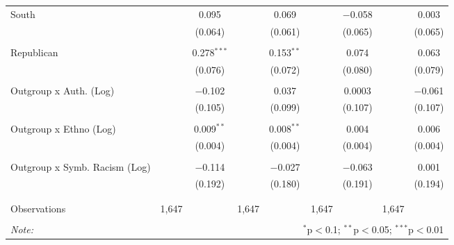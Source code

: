 \begin{table}[H]
{\begin{tabular}{@{\extracolsep{5pt}}lcccccccc}
 South &  & 0.095 &  & 0.069 &  & $-$0.058 &  & 0.003 \\ 
  &  & (0.064) &  & (0.061) &  & (0.065) &  & (0.065) \\ 
  & & & & & & & & \\ 
 Republican &  & 0.278$^{***}$ &  & 0.153$^{**}$ &  & 0.074 &  & 0.063 \\ 
  &  & (0.076) &  & (0.072) &  & (0.080) &  & (0.079) \\ 
  & & & & & & & & \\ 
 Outgroup x Auth. (Log) &  & $-$0.102 &  & 0.037 &  & 0.0003 &  & $-$0.061 \\ 
  &  & (0.105) &  & (0.099) &  & (0.107) &  & (0.107) \\ 
  & & & & & & & & \\ 
 Outgroup x Ethno (Log) &  & 0.009$^{**}$ &  & 0.008$^{**}$ &  & 0.004 &  & 0.006 \\ 
  &  & (0.004) &  & (0.004) &  & (0.004) &  & (0.004) \\ 
  & & & & & & & & \\ 
 Outgroup x Symb. Racism (Log) &  & $-$0.114 &  & $-$0.027 &  & $-$0.063 &  & 0.001 \\ 
  &  & (0.192) &  & (0.180) &  & (0.191) &  & (0.194) \\ 
  & & & & & & & & \\ 
\hline \\[-1.8ex] 
Observations & 1,647 &  & 1,647 &  & 1,647 &  & 1,647 &  \\ 
\hline 
\hline \\[-1.8ex] 
\textit{Note:}  & \multicolumn{8}{r}{$^{*}$p$<$0.1; $^{**}$p$<$0.05; $^{***}$p$<$0.01} \\ 
\end{tabular}} 
\end{table} 
